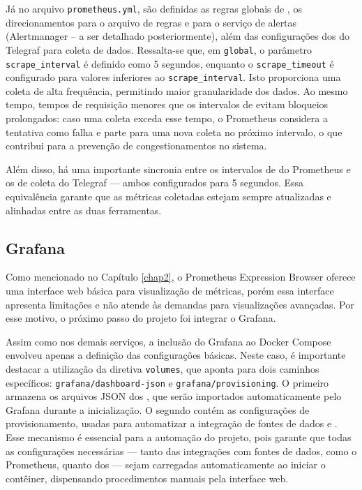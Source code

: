 Já no arquivo \verb|prometheus.yml|, são definidas as regras globais de , os direcionamentos para o arquivo de regras e para o serviço de alertas (Alertmanager -- a ser detalhado posteriormente), além das configurações dos  do Telegraf para coleta de dados. Ressalta-se que, em \verb|global|, o parâmetro \verb|scrape_interval| é definido como 5 segundos, enquanto o \verb|scrape_timeout| é configurado para valores inferiores ao \verb|scrape_interval|. Isto proporciona uma coleta de alta frequência, permitindo maior granularidade dos dados. Ao mesmo tempo, tempos de requisição menores que os intervalos de  evitam bloqueios prolongados: caso uma coleta exceda esse tempo, o Prometheus considera a tentativa como falha e parte para uma nova coleta no próximo intervalo, o que contribui para a prevenção de congestionamentos no sistema.

Além disso, há uma importante sincronia entre os intervalos de  do Prometheus e os de coleta do Telegraf --- ambos configurados para 5 segundos. Essa equivalência garante que as métricas coletadas estejam sempre atualizadas e alinhadas entre as duas ferramentas.

\subsection{Grafana}
\label{subsection:GrafanaVisualizacao}

Como mencionado no Capítulo \ref{chap2}, o Prometheus Expression Browser oferece uma interface web básica para visualização de métricas, porém essa interface apresenta limitações e não atende às demandas para visualizações avançadas. Por esse motivo, o próximo passo do projeto foi integrar o Grafana.

Assim como nos demais serviços, a inclusão do Grafana ao Docker Compose envolveu apenas a definição das configurações básicas. Neste caso, é importante destacar a utilização da diretiva \verb|volumes|, que aponta para dois caminhos específicos: \verb|grafana/dashboard-json| e \verb|grafana/provisioning|. O primeiro armazena os arquivos JSON dos , que serão importados automaticamente pelo Grafana durante a inicialização. O segundo contém as configurações de provisionamento, usadas para automatizar a integração de fontes de dados e . Esse mecanismo é essencial para a automação do projeto, pois garante que todas as configurações necessárias --- tanto das integrações com fontes de dados, como o Prometheus, quanto dos  --- sejam carregadas automaticamente ao iniciar o contêiner, dispensando procedimentos manuais pela interface web.


